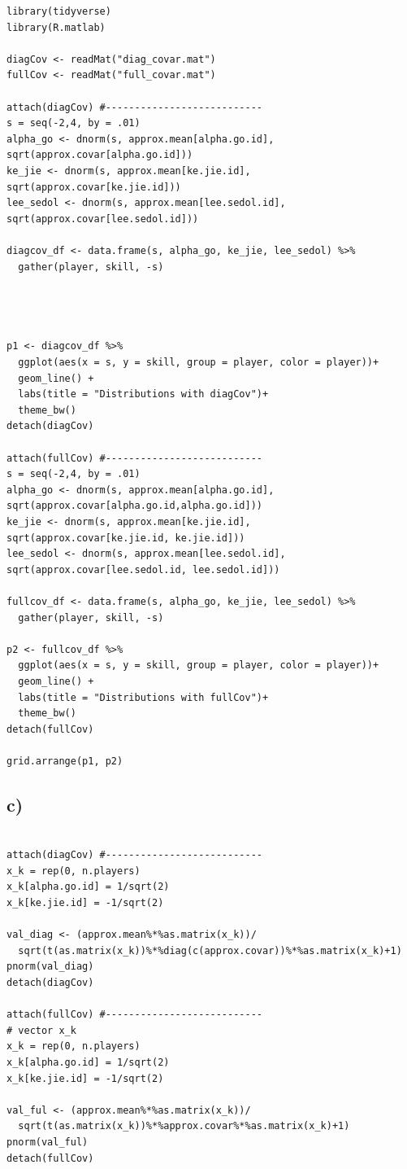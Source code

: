 \documentclass{article}
\begin{document}
\begin{lstlisting}
library(tidyverse)
library(R.matlab)

diagCov <- readMat("diag_covar.mat")
fullCov <- readMat("full_covar.mat")

attach(diagCov) #---------------------------
s = seq(-2,4, by = .01)
alpha_go <- dnorm(s, approx.mean[alpha.go.id], sqrt(approx.covar[alpha.go.id]))
ke_jie <- dnorm(s, approx.mean[ke.jie.id], sqrt(approx.covar[ke.jie.id]))
lee_sedol <- dnorm(s, approx.mean[lee.sedol.id], sqrt(approx.covar[lee.sedol.id]))

diagcov_df <- data.frame(s, alpha_go, ke_jie, lee_sedol) %>% 
  gather(player, skill, -s)
  


  
p1 <- diagcov_df %>% 
  ggplot(aes(x = s, y = skill, group = player, color = player))+
  geom_line() +
  labs(title = "Distributions with diagCov")+
  theme_bw()
detach(diagCov) 

attach(fullCov) #---------------------------
s = seq(-2,4, by = .01)
alpha_go <- dnorm(s, approx.mean[alpha.go.id], sqrt(approx.covar[alpha.go.id,alpha.go.id]))
ke_jie <- dnorm(s, approx.mean[ke.jie.id], sqrt(approx.covar[ke.jie.id, ke.jie.id]))
lee_sedol <- dnorm(s, approx.mean[lee.sedol.id], sqrt(approx.covar[lee.sedol.id, lee.sedol.id]))

fullcov_df <- data.frame(s, alpha_go, ke_jie, lee_sedol) %>% 
  gather(player, skill, -s)

p2 <- fullcov_df %>% 
  ggplot(aes(x = s, y = skill, group = player, color = player))+
  geom_line() +
  labs(title = "Distributions with fullCov")+
  theme_bw()
detach(fullCov) 
  
grid.arrange(p1, p2)
\end{lstlisting}


\subsection*{c)}

\begin{lstlisting}

attach(diagCov) #---------------------------
x_k = rep(0, n.players)
x_k[alpha.go.id] = 1/sqrt(2)
x_k[ke.jie.id] = -1/sqrt(2)

val_diag <- (approx.mean%*%as.matrix(x_k))/
  sqrt(t(as.matrix(x_k))%*%diag(c(approx.covar))%*%as.matrix(x_k)+1)
pnorm(val_diag)
detach(diagCov) 

attach(fullCov) #---------------------------
# vector x_k
x_k = rep(0, n.players)
x_k[alpha.go.id] = 1/sqrt(2)
x_k[ke.jie.id] = -1/sqrt(2)

val_ful <- (approx.mean%*%as.matrix(x_k))/
  sqrt(t(as.matrix(x_k))%*%approx.covar%*%as.matrix(x_k)+1)
pnorm(val_ful)
detach(fullCov) 
\end{lstlisting}
\end{document}

